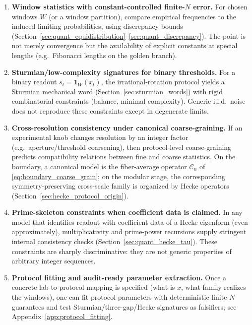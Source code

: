\begin{enumerate}
  \item \textbf{Window statistics with constant-controlled finite-$N$ error.}
  For chosen windows $W$ (or a window partition), compare empirical frequencies to the induced limiting probabilities, using discrepancy bounds (Section~\ref{sec:quant_equidistribution}--\ref{sec:quant_discrepancy}). The point is not merely convergence but the availability of explicit constants at special lengths (e.g.\ Fibonacci lengths on the golden branch).

  \item \textbf{Sturmian/low-complexity signatures for binary thresholds.}
  For a binary readout $s_t=\mathbf{1}_W(x_t)$, the irrational-rotation protocol yields a Sturmian mechanical word (Section~\ref{sec:sturmian_words}) with rigid combinatorial constraints (balance, minimal complexity). Generic i.i.d.\ noise does not reproduce these constraints except in degenerate limits.

  \item \textbf{Cross-resolution consistency under canonical coarse-graining.}
  If an experimental knob changes resolution by an integer factor (e.g.\ aperture/threshold coarsening), then protocol-level coarse-graining predicts compatibility relations between fine and coarse statistics. On the boundary, a canonical model is the fiber-average operator $\mathcal{C}_n$ of \eqref{eq:boundary_coarse_grain}; on the modular stage, the corresponding symmetry-preserving cross-scale family is organized by Hecke operators (Section~\ref{sec:hecke_protocol_origin}).

  \item \textbf{Prime-skeleton constraints when coefficient data is claimed.}
  In any model that identifies readout with coefficient data of a Hecke eigenform (even approximately), multiplicativity and prime-power recursions supply stringent internal consistency checks (Section~\ref{sec:quant_hecke_tau}). These constraints are sharply discriminative: they are not generic properties of arbitrary integer sequences.

  \item \textbf{Protocol fitting and audit-ready parameter extraction.}
  Once a concrete lab-to-protocol mapping is specified (what is $x$, what family realizes the windows), one can fit protocol parameters with deterministic finite-$N$ guarantees and test Sturmian/three-gap/Hecke signatures as falsifiers; see Appendix~\ref{app:protocol_fitting}.
\end{enumerate}

